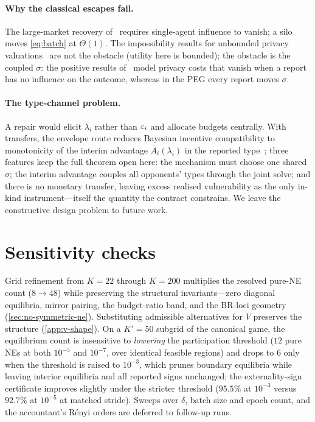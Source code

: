 \paragraph{Why the classical escapes fail.} The large-market recovery
of~\cite{kearns2014mechanism} requires single-agent influence to
vanish; a silo moves \eqref{eq:batch} at $\Theta(1)$. The impossibility results
for unbounded privacy valuations~\cite{nissim2014redrawing,
ghosh2011selling} are not the obstacle (utility here is bounded); the
obstacle is the coupled $\sigma$: the positive results
of~\cite{chen2013truthful} model privacy costs that vanish when a
report has no influence on the outcome, whereas in the \ac{PEG} every
report moves $\sigma$.

\paragraph{The type-channel problem.} A repair would elicit $\lambda_i$
rather than $\varepsilon_i$ and allocate budgets centrally. With transfers,
the envelope route reduces Bayesian incentive compatibility to
monotonicity of the interim advantage $\overline{A}_i(\lambda_i)$ in the
reported type~\cite{myerson1981optimal, rochet1987necessary,
roberts1979characterization}; three features keep the full theorem
open here: the mechanism must choose one shared $\sigma$; the interim
advantage couples all opponents' types through the joint solve; and
there is no monetary transfer, leaving excess realised vulnerability
as the only in-kind instrument---itself the quantity the contract
constrains. We leave the constructive design problem to future work.

\section{Sensitivity checks}
\label{app:sensitivity}

Grid refinement from $K=22$ through $K=200$ multiplies the resolved
pure-\ac{NE} count ($8 \to 48$) while preserving the structural
invariants---zero diagonal equilibria, mirror pairing, the
budget-ratio band, and the BR-loci geometry (\cref{sec:no-symmetric-ne}).
Substituting admissible alternatives for $V$ preserves the structure
(\cref{app:v-shape}). On a $K' = 50$ subgrid of the canonical game,
the equilibrium count is insensitive to \emph{lowering} the
participation threshold ($12$ pure \acp{NE} at both $10^{-5}$ and
$10^{-7}$, over identical feasible regions) and drops to $6$ only
when the threshold is raised to $10^{-3}$, which prunes boundary
equilibria while leaving interior equilibria and all reported signs
unchanged; the externality-sign certificate improves slightly under
the stricter threshold ($95.5\%$ at $10^{-3}$ versus $92.7\%$ at
$10^{-5}$ at matched stride). Sweeps over $\delta$, batch size and
epoch count, and the accountant's R\'enyi orders are deferred to
follow-up runs.
